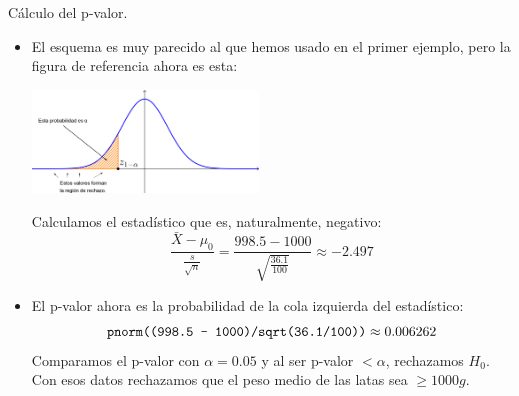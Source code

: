 \documentclass[
  9pt,
  ignorenonframetext,
]{beamer}
\begin{document}
\begin{frame}{Cálculo del p-valor.}
\protect\hypertarget{calculo-del-p-valor.}{}

\begin{itemize}
\item
  El esquema es muy parecido al que hemos usado en el primer ejemplo,
  pero la figura de referencia ahora es esta:

  \begin{center}\includegraphics[width=6cm]{../fig/07-03-RegionRechazoNormalColaIzquierda} \end{center}

  Calculamos el estadístico que es, naturalmente, negativo:
  \[\dfrac{\bar X - \mu_0}{\frac{s}{\sqrt{n}}} = 
  \dfrac{998.5 - 1000}{\sqrt{\frac{36.1}{100}}} \approx 
  -2.497
  \]
\item
  El p-valor ahora es la probabilidad de la cola izquierda del
  estadístico: \[
  \text{\tt pnorm((998.5 - 1000)/sqrt(36.1/100))} \approx 0.006262
  \] Comparamos el p-valor con \(\alpha = 0.05\) y al ser p-valor
  \(< \alpha\), rechazamos \(H_0\). Con esos datos rechazamos que el
  peso medio de las latas sea \(\geq 1000g\).
\end{itemize}

\end{frame}
\end{document}
